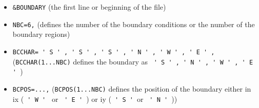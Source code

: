 \documentclass[11pt]{article}
\begin{document}
\begin{itemize}
\item  \texttt{\&BOUNDARY} (the first line or beginning of the file)

\item  \texttt{NBC=6,} (defines the number of the boundary conditions or the
number of the boundary regions)

\item  \texttt{BCCHAR= 
\'{}%
S 
\'{}%
, 
\'{}%
S%
\'{}%
, 
\'{}%
S%
\'{}%
, 
\'{}%
N%
\'{}%
, 
\'{}%
W%
\'{}%
, 
\'{}%
E%
\'{}%
,} (\texttt{BCCHAR(1...NBC)} defines the boundary as \texttt{%
\'{}%
S%
\'{}%
, 
\'{}%
N%
\'{}%
, 
\'{}%
W%
\'{}%
, 
\'{}%
E%
\'{}%
})

\item  \texttt{BCPOS=...,} (\texttt{BCPOS(1...NBC)} defines the position of
the boundary either in ix (\texttt{%
\'{}%
W%
\'{}%
} or \texttt{%
\'{}%
E%
\'{}%
}) or iy (\texttt{%
\'{}%
S%
\'{}%
}or \texttt{%
\'{}%
N%
\'{}%
}))


\end{itemize}
\end{document}
